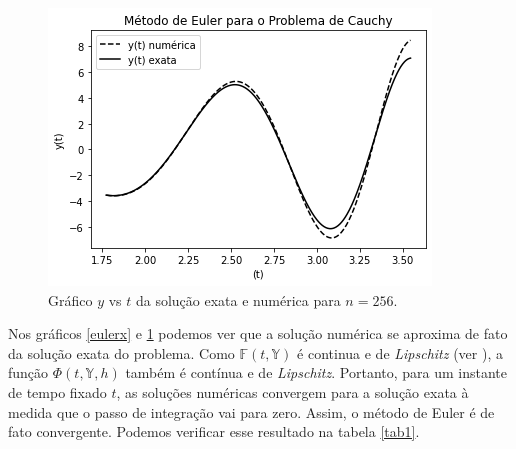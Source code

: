\documentclass[amsmath,amssymb,floatfix]{revtex4}
\begin{document}
\begin{figure}[H]
\centering
\includegraphics[scale=0.56]{eulery_num_exata}
\caption{Gráfico $y$ vs $t$ da solução exata e numérica para $n=256$.}
\label{eulery}
\end{figure}

Nos gráficos \ref{eulerx} e \ref{eulery} podemos ver que a solução numérica se aproxima de fato da solução exata do problema. Como $\mathbb{F}(t,\mathbb{Y})$ é continua e de \textit{Lipschitz} (ver \cite{numerical}), a função $\Phi(t,\mathbb{Y},h)$ também é contínua e de \textit{Lipschitz}. Portanto, para um instante de tempo fixado $t$, as soluções numéricas convergem para a solução exata à medida que o passo de integração vai para zero. Assim, o método de Euler é de fato convergente. Podemos verificar esse resultado na tabela \ref{tab1}.
\end{document}

